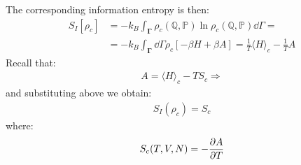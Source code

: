 \documentclass[../../main.tex]{subfiles}
\begin{document}
\begin{itemize}
    The corresponding information entropy is then:
    \begin{align*}
        S_I[\rho_c] &= -k_B \int_{\bm{\Gamma}} \rho_c (\mathbb{Q}, \mathbb{P}) \ln \rho_c(\mathbb{Q}, \mathbb{P}) \dd{\Gamma} = \\
        &= -k_B \int_{\bm{\Gamma}} \dd{\Gamma} \rho_c [-\beta H + \beta A] = \frac{1}{T} \langle H \rangle_c - \frac{1}{T} A 
    \end{align*}
    Recall that:
    \begin{align*}
        A = \langle H \rangle_c - T S_c \Rightarrow 
    \end{align*}
    and substituting above we obtain:
    \begin{align*}
        S_I(\rho_c) = S_c
    \end{align*}
    where:
    \begin{align*}
        S_c(T,V,N) = - \pdv{A}{T}(T,V,N)
    \end{align*}
\end{itemize}


\end{document}
